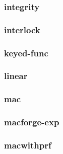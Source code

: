 \begin{frame}\frametitle{integrity}
\begin{figure}
\begin{center}

\end{center}
\end{figure}
\end{frame}
\begin{frame}\frametitle{interlock}
\begin{figure}
\begin{center}

\end{center}
\end{figure}
\end{frame}
\begin{frame}\frametitle{keyed-func}
\begin{figure}
\begin{center}

\end{center}
\end{figure}
\end{frame}
\begin{frame}\frametitle{linear}
\begin{figure}
\begin{center}

\end{center}
\end{figure}
\end{frame}
\begin{frame}\frametitle{mac}
\begin{figure}
\begin{center}

\end{center}
\end{figure}
\end{frame}
\begin{frame}\frametitle{macforge-exp}
\begin{figure}
\begin{center}

\end{center}
\end{figure}
\end{frame}
\begin{frame}\frametitle{macwithprf}
\begin{figure}
\begin{center}

\end{center}
\end{figure}
\end{frame}
